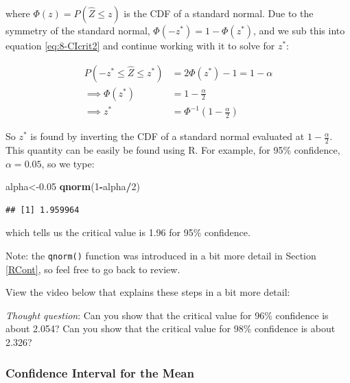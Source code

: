 \documentclass[
]{book}
\newenvironment{Shaded}{\begin{snugshade}}{\end{snugshade}}
\newcommand{\DecValTok}[1]{\textcolor[rgb]{0.00,0.00,0.81}{#1}}
\newcommand{\FloatTok}[1]{\textcolor[rgb]{0.00,0.00,0.81}{#1}}
\newcommand{\FunctionTok}[1]{\textcolor[rgb]{0.13,0.29,0.53}{\textbf{#1}}}
\newcommand{\NormalTok}[1]{#1}
\newcommand{\OtherTok}[1]{\textcolor[rgb]{0.56,0.35,0.01}{#1}}
\newcommand{\SpecialCharTok}[1]{\textcolor[rgb]{0.81,0.36,0.00}{\textbf{#1}}}
\begin{document}
where \(\Phi(z) = P(\hat{Z} \leq z)\) is the CDF of a standard normal. Due to the symmetry of the standard normal, \(\Phi(-z^{*}) = 1- \Phi(z^{*})\), and we sub this into equation \eqref{eq:8-CIcrit2} and continue working with it to solve for \(z^*\):

\begin{equation} 
\begin{split}
P(-z^{*} \leq \hat{Z} \leq z^{*}) &= 2 \Phi(z^*) - 1 = 1 - \alpha \\
\implies \Phi(z^*) &= 1 - \frac{\alpha}{2} \\
\implies z^* &= \Phi^{-1} \left(1 - \frac{\alpha}{2} \right)
\end{split}
\label{eq:8-CIcrit3}
\end{equation}

So \(z^*\) is found by inverting the CDF of a standard normal evaluated at \(1 - \frac{\alpha}{2}\). This quantity can be easily be found using R. For example, for 95\% confidence, \(\alpha = 0.05\), so we type:

\begin{Shaded}
\begin{Highlighting}[]
\NormalTok{alpha}\OtherTok{\textless{}{-}}\FloatTok{0.05}
\FunctionTok{qnorm}\NormalTok{(}\DecValTok{1}\SpecialCharTok{{-}}\NormalTok{alpha}\SpecialCharTok{/}\DecValTok{2}\NormalTok{)}
\end{Highlighting}
\end{Shaded}

\begin{verbatim}
## [1] 1.959964
\end{verbatim}

which tells us the critical value is 1.96 for 95\% confidence.

Note: the \texttt{qnorm()} function was introduced in a bit more detail in Section \ref{RCont}, so feel free to go back to review.

View the video below that explains these steps in a bit more detail:

\emph{Thought question}: Can you show that the critical value for 96\% confidence is about 2.054? Can you show that the critical value for 98\% confidence is about 2.326?

\hypertarget{confidence-interval-for-the-mean}{%
\subsubsection{Confidence Interval for the Mean}\label{confidence-interval-for-the-mean}}
\end{document}
